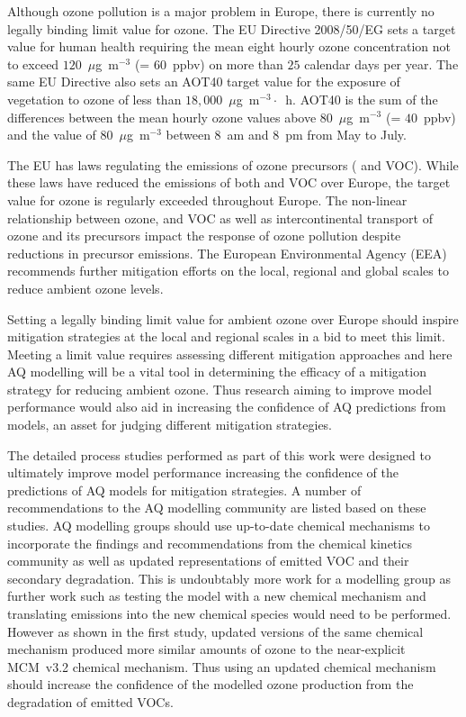 Although ozone pollution is a major problem in Europe, there is currently no legally binding limit value for ozone.
The EU Directive 2008/50/EG sets a target value for human health requiring the mean eight hourly ozone concentration not to exceed $120$~$\mu$g~m$^{-3}$ (= $60$~ppbv) on more than $25$ calendar days per year.
The same EU Directive also sets an AOT40 target value for the exposure of vegetation to ozone of less than $18,000$~$\mu$g~m$^{-3} \cdot$~h. 
AOT40 is the sum of the differences between the mean hourly ozone values above $80$~$\mu$g~m$^{-3}$ (= $40$~ppbv) and the value of $80$~$\mu$g~m$^{-3}$ between 8~am and 8~pm from May to July.

The EU has laws regulating the emissions of ozone precursors ( and VOC).
While these laws have reduced the emissions of both  and VOC over Europe, the target value for ozone is regularly exceeded throughout Europe.
The non-linear relationship between ozone,  and VOC as well as intercontinental transport of ozone and its precursors impact the response of ozone pollution despite reductions in precursor emissions.
The European Environmental Agency (EEA) recommends further mitigation efforts on the local, regional and global scales to reduce ambient ozone levels.

Setting a legally binding limit value for ambient ozone over Europe should inspire mitigation strategies at the local and regional scales in a bid to meet this limit.
Meeting a limit value requires assessing different mitigation approaches and here AQ modelling will be a vital tool in determining the efficacy of a mitigation strategy for reducing ambient ozone. 
Thus research aiming to improve model performance would also aid in increasing the confidence of AQ predictions from models, an asset for judging different mitigation strategies.

The detailed process studies performed as part of this work were designed to ultimately improve model performance increasing the confidence of the predictions of AQ models for mitigation strategies.
A number of recommendations to the AQ modelling community are listed based on these studies.
AQ modelling groups should use up-to-date chemical mechanisms to incorporate the findings and recommendations from the chemical kinetics community as well as updated representations of emitted VOC and their secondary degradation.
This is undoubtably more work for a modelling group as further work such as testing the model with a new chemical mechanism and translating emissions into the new chemical species would need to be performed.
However as shown in the first study, updated versions of the same chemical mechanism produced more similar amounts of ozone to the near-explicit MCM~v3.2 chemical mechanism.
Thus using an updated chemical mechanism should increase the confidence of the modelled ozone production from the degradation of emitted VOCs.


